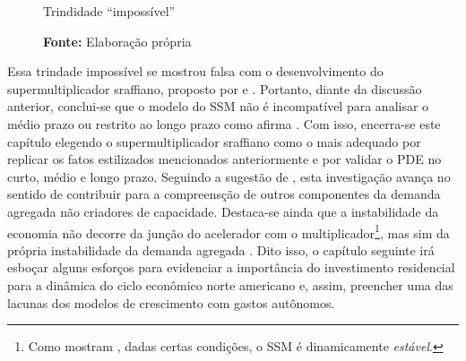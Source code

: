 \begin{figure}[htb]
    \caption{Trindidade ``impossível''}
    \label{diagrama}
    \begin{center}
\end{center}
\caption*{\textbf{Fonte:} Elaboração própria}
\end{figure}
\noindent Essa trindade impossível se mostrou falsa com o desenvolvimento do supermultiplicador sraffiano, proposto por \textcite{serrano_long_1995} e \textcite{bortis_institutions_1996}. Portanto, diante da discussão anterior, conclui-se que o modelo do SSM não é incompatível para analisar o médio prazo ou restrito ao longo prazo como afirma \textcite{nikiforos_comments_2018}. Com isso, encerra-se este capítulo elegendo o supermultiplicador sraffiano como o mais adequado por replicar os fatos estilizados mencionados anteriormente e por validar o PDE no curto, médio e longo prazo. Seguindo a sugestão de \textcite[p.~280]{freitas_growth_2015}, esta investigação avança no sentido de contribuir para a compreensção de outros componentes da demanda agregada não criadores de capacidade. Destaca-se ainda que a instabilidade da economia não decorre da junção do acelerador com o multiplicador\footnote{Como mostram \textcite{serrano_trouble_2017}, dadas certas condições, o SSM é dinamicamente \textit{estável}.}, mas sim da própria instabilidade da demanda agregada \cite{dejuan_hidden_2017}.  Dito isso,  o capítulo seguinte irá esboçar alguns esforços para evidenciar a importância do investimento residencial para a dinâmica do ciclo econômico norte americano e, assim, preencher uma das lacunas dos modelos de crescimento com gastos autônomos.






